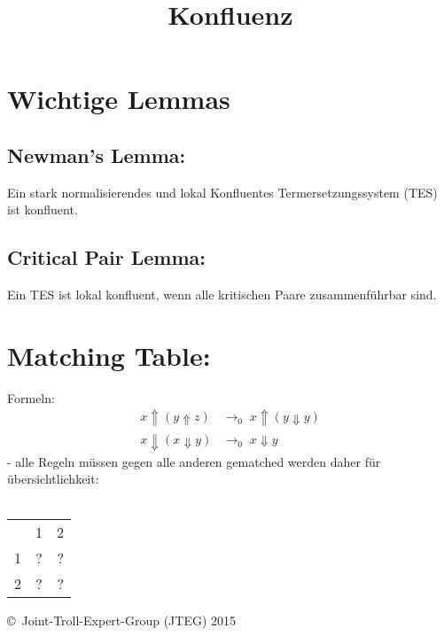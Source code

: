\documentclass{article}
\title{Konfluenz}
\date{ }
\begin{document}
	\section*{Wichtige Lemmas}
		\subsection*{Newman's Lemma:}
			Ein stark normalisierendes und lokal Konfluentes Termersetzungssystem (TES) ist konfluent.
		\subsection*{Critical Pair Lemma:}
			Ein TES ist lokal konfluent, wenn alle kritischen Paare zusammenf\"uhrbar sind.
		\section{Matching Table:}
			Formeln:
			\begin{align}
				x \Uparrow ( y \Uparrow z) & \rightarrow_{0}
					\; x \Uparrow (y \Downarrow y)
				\\				
				x \Downarrow ( x \Downarrow y ) & \rightarrow_0
					\; x \Downarrow y
			\end{align}
			- alle Regeln m\"ussen gegen alle anderen gematched werden 
			daher f\"ur \"ubersichtlichkeit:\\ \\
			\begin{tabular}{l c r}
				  & 1 & 2 \\
				1 & ? & ? \\
				2 & ? & ? \\
			\end{tabular}		
		
		
		
		
		
		
		
		
		
		
		
		
		
		
		
		
	
		
		
		
	\begin{tiny}
	\copyright\ Joint-Troll-Expert-Group (JTEG) 2015
	\end{tiny}
\end{document}
